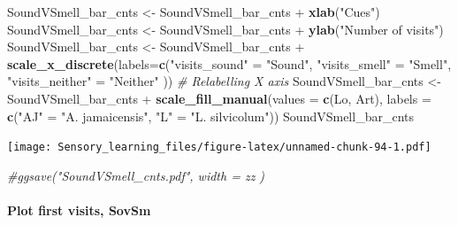 \documentclass[]{article}
\newenvironment{Shaded}{\begin{snugshade}}{\end{snugshade}}
\newcommand{\KeywordTok}[1]{\textcolor[rgb]{0.13,0.29,0.53}{\textbf{{#1}}}}
\newcommand{\DataTypeTok}[1]{\textcolor[rgb]{0.13,0.29,0.53}{{#1}}}
\newcommand{\StringTok}[1]{\textcolor[rgb]{0.31,0.60,0.02}{{#1}}}
\newcommand{\CommentTok}[1]{\textcolor[rgb]{0.56,0.35,0.01}{\textit{{#1}}}}
\newcommand{\NormalTok}[1]{{#1}}
\let\oldparagraph\paragraph
\renewcommand{\paragraph}[1]{\oldparagraph{#1}\mbox{}}
\begin{document}
\begin{Shaded}
\begin{Highlighting}[]
\NormalTok{SoundVSmell_bar_cnts <-}\StringTok{ }\NormalTok{SoundVSmell_bar_cnts +}\StringTok{ }\KeywordTok{xlab}\NormalTok{(}\StringTok{"Cues"}\NormalTok{)}
\NormalTok{SoundVSmell_bar_cnts <-}\StringTok{ }\NormalTok{SoundVSmell_bar_cnts +}\StringTok{ }\KeywordTok{ylab}\NormalTok{(}\StringTok{"Number of visits"}\NormalTok{)}
\NormalTok{SoundVSmell_bar_cnts <-}\StringTok{ }\NormalTok{SoundVSmell_bar_cnts +}\StringTok{ }\KeywordTok{scale_x_discrete}\NormalTok{(}\DataTypeTok{labels=}\KeywordTok{c}\NormalTok{(}\StringTok{"visits_sound"} \NormalTok{=}\StringTok{ "Sound"}\NormalTok{, }\StringTok{"visits_smell"} \NormalTok{=}\StringTok{ "Smell"}\NormalTok{,}
                              \StringTok{"visits_neither"} \NormalTok{=}\StringTok{ "Neither"} \NormalTok{))  }\CommentTok{# Relabelling X axis}
\NormalTok{SoundVSmell_bar_cnts <-}\StringTok{ }\NormalTok{SoundVSmell_bar_cnts +}\StringTok{ }\KeywordTok{scale_fill_manual}\NormalTok{(}\DataTypeTok{values =} \KeywordTok{c}\NormalTok{(Lo, Art), }\DataTypeTok{labels =} \KeywordTok{c}\NormalTok{(}\StringTok{"AJ"} \NormalTok{=}\StringTok{ "A. jamaicensis"}\NormalTok{, }\StringTok{"L"} \NormalTok{=}\StringTok{ "L. silvicolum"}\NormalTok{))}
\NormalTok{SoundVSmell_bar_cnts}
\end{Highlighting}
\end{Shaded}

\texttt{[image: Sensory\_learning\_files/figure-latex/unnamed-chunk-94-1.pdf]}

\begin{Shaded}
\begin{Highlighting}[]
\CommentTok{#ggsave("SoundVSmell_cnts.pdf", width = zz  )}
\end{Highlighting}
\end{Shaded}

\paragraph{Plot first visits, SovSm}\label{plot-first-visits-sovsm-1}
\end{document}
